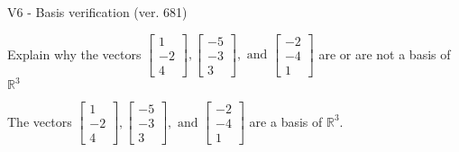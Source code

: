 \begin{exercise}
  \begin{exerciseTitle}V6 - Basis verification (ver. 681)\end{exerciseTitle}
  \begin{exerciseStatement}
    Explain why the vectors \(\left[\begin{array}{r}
1 \\
-2 \\
4
\end{array}\right] , \left[\begin{array}{r}
-5 \\
-3 \\
3
\end{array}\right] , \text{ and } \left[\begin{array}{r}
-2 \\
-4 \\
1
\end{array}\right]\) are or are not a basis of \(\mathbb{R}^3\)	


  \end{exerciseStatement}
  \begin{exerciseAnswer}
   The vectors \(\left[\begin{array}{r}
1 \\
-2 \\
4
\end{array}\right] , \left[\begin{array}{r}
-5 \\
-3 \\
3
\end{array}\right] , \text{ and } \left[\begin{array}{r}
-2 \\
-4 \\
1
\end{array}\right]\) 
  	 are  a basis of \(\mathbb{R}^3\).
  


  \end{exerciseAnswer}
\end{exercise}